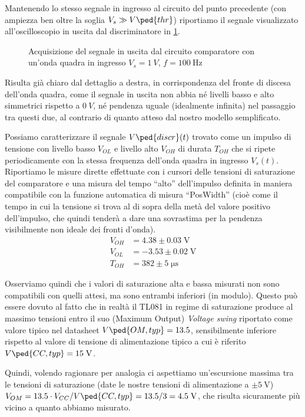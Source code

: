\documentclass[10pt, a4paper, italian]{article}
\begin{document}
Mantenendo lo stesso segnale in ingresso al circuito del punto precedente
(con ampiezza ben oltre la soglia $V_s \gg V\ped{thr}$) riportiamo il
segnale visualizzato all'oscilloscopio in uscita dal discriminatore in
\cref{fig: discr}.
\begin{figure}[htbp]
	\centering
	\caption{Acquisizione del segnale in uscita dal circuito comparatore con
	un'onda quadra in ingresso $V_s = \SI{1}{V}$, $f = \SI{100}{\Hz}$
	\label{fig: discr}}
\end{figure}

Risulta già chiaro dal dettaglio a destra, in corrispondenza del fronte di
discesa dell'onda quadra, come il segnale in uscita non abbia né livelli basso
e alto simmetrici rispetto a $\SI{0}{V}$, né pendenza uguale (idealmente
infinita) nel passaggio tra questi due, al contrario di quanto atteso dal
nostro modello semplificato.

Possiamo caratterizzare il segnale $V\ped{discr} (t)$ trovato come un impulso
di tensione con livello basso $V_{OL}$ e livello alto $V_{OH}$ di durata
$T_{OH}$ che si ripete periodicamente con la stessa frequenza dell'onda quadra
in ingresso $V_s (t)$.
Riportiamo le misure dirette effettuate con i cursori
delle tensioni di saturazione del comparatore e una misura del tempo ``alto''
dell'impulso definita in maniera compatibile con la funzione automatica di
misura ``PosWidth'' (cioè come il tempo in cui la tensione si trova al di
sopra della metà del valore positivo dell'impulso, che quindi tenderà a dare
una sovrastima per la pendenza visibilmente non ideale dei fronti d'onda).
\begin{align*}
V_{OH} &= 4.38 \pm 0.03 \; \si{\V} \\
V_{OL} &= -3.53 \pm 0.02 \; \si{\V} \\
T_{OH} &= 382 \pm 5 \; \si{\micro\s}
\end{align*}

Osserviamo quindi che i valori di saturazione alta e bassa misurati non sono
compatibili con quelli attesi, ma sono entrambi inferiori (in modulo). Questo
può essere dovuto al fatto che in realtà il TL081 in regime di saturazione
produce al massimo tensioni entro il suo (Maximum Output) \emph{Voltage swing}
riportato come valore tipico nel datasheet $V\ped{OM, typ} = 13.5$,
sensibilmente inferiore rispetto al valore di tensione di alimentazione tipico
a cui è riferito $V\ped{CC, typ} = 15 \; \si{\V}$.

Quindi, volendo ragionare per analogia ci aspettiamo un'escursione massima tra
le tensioni di saturazione (date le nostre tensioni di alimentazione a
$\pm \SI{5}{\V}$) $V_{OM} = 13.5 \cdot V_{CC} / V\ped{CC, typ} =
13.5 /3 = 4.5 \; \si{\V}$, che risulta sicuramente più vicino a quanto
abbiamo misurato.
\end{document}
